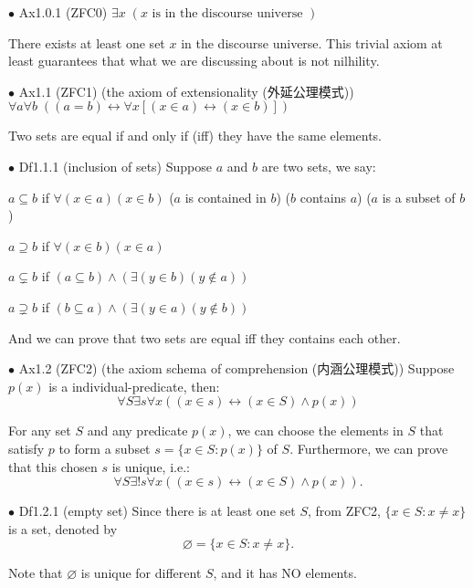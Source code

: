 \documentclass{article}
\begin{document}
\begin{Ax}{$\bullet$ Ax1.0.1 (ZFC0)}
    \textcolor{Ax}{$\exists x\; (x \text{ is in the discourse universe })$}
\end{Ax}
There exists at least one set $x$ in the discourse universe. This trivial axiom at least guarantees that what we are discussing about is not nilhility.

\begin{Ax}{$\bullet$ Ax1.1 (ZFC1) (the axiom of extensionality (外延公理模式))}
    \textcolor{Ax}{$\forall a\forall b \;\left((a=b)\leftrightarrow \forall x [(x\in a)\leftrightarrow (x\in b)]\right)$}
\end{Ax}
Two sets are equal if and only if (iff) they have the same elements.

\begin{Df}{$\bullet$ Df1.1.1 (inclusion of sets)}
    Suppose $a$ and $b$ are two sets, we say:
    \begin{compactitem}
        \item $a\subseteq b$ if $\forall (x\in a) (x\in b)$ \quad($a$ is contained in $b$) ($b$ contains $a$) ($a$ is a subset of $b$)
        \item $a\supseteq b$ if $\forall (x\in b) (x\in a)$
        \item $a\subsetneq b$ if $(a\subseteq b)\land (\exists (y\in b) (y\notin a))$
        \item $a\supsetneq b$ if $(b\subseteq a)\land (\exists (y\in a) (y\notin b))$ 
    \end{compactitem}
\end{Df}
And we can prove that \textcolor{Th}{two sets are equal iff they contains each other.}

\begin{Ax}{$\bullet$ Ax1.2 (ZFC2) (the axiom schema of comprehension (内涵公理模式)) }
    \textcolor{Ax}{Suppose $p(x)$ is a individual-predicate, then:
    $$\forall S\exists s\forall x\left((x\in s)\leftrightarrow (x\in S)\land p(x)\right)$$}
\end{Ax}
For any set $S$ and any predicate $p(x)$, we can choose the elements in $S$ that satisfy $p$ to form a subset $s=\{x\in S: p(x)\}$ of $S$. \textcolor{Th}{Furthermore, we can prove that this chosen $s$ is unique, i.e.:
    $$\forall S\exists! s\forall x\left((x\in s)\leftrightarrow (x\in S)\land p(x)\right).$$}

\begin{Df}{$\bullet$ Df1.2.1 (empty set)}
    Since there is at least one set $S$, from ZFC2, $\{x\in S: x\neq x\}$ is a set, denoted by $$\varnothing = \{x\in S: x\neq x\}.$$ 
\end{Df}
\textcolor{Th}{Note that $\varnothing$ is unique for different $S$, and it has NO elements.}
\end{document}
